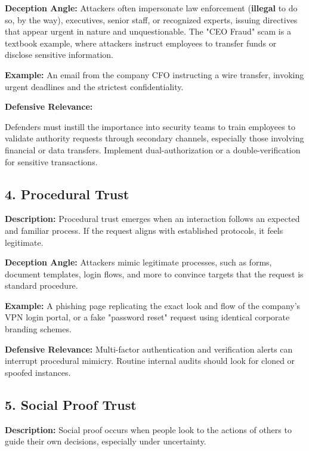 \textbf{Deception Angle:} Attackers often impersonate law enforcement (\textbf{illegal} to do so, by the way), executives, senior staff, or recognized experts, issuing directives that appear urgent in nature and unquestionable. The "CEO Fraud" scam is a textbook example, where attackers instruct employees to transfer funds or disclose sensitive information.

\textbf{Example:} An email from the company CFO instructing a wire transfer, invoking urgent deadlines and the strictest confidentiality.

\begin{svgraybox}
    \textbf{Defensive Relevance:}

    Defenders must instill the importance into security teams to train employees to validate authority requests through secondary channels, especially those involving financial or data transfers. Implement dual-authorization or a double-verification for sensitive transactions.
\end{svgraybox}

\subsection{4. Procedural Trust}
\textbf{Description:} Procedural trust emerges when an interaction follows an expected and familiar process. If the request aligns with established protocols, it feels legitimate.

\textbf{Deception Angle:} Attackers mimic legitimate processes, such as forms, document templates, login flows, and more to convince targets that the request is standard procedure.

\textbf{Example:} A phishing page replicating the exact look and flow of the company's VPN login portal, or a fake "password reset" request using identical corporate branding schemes.

\begin{svgraybox}
    \textbf{Defensive Relevance:}
    Multi-factor authentication and verification alerts can interrupt procedural mimicry. Routine internal audits should look for cloned or spoofed instances.
\end{svgraybox}

\subsection{5. Social Proof Trust}
\textbf{Description:} Social proof occurs when people look to the actions of others to guide their own decisions, especially under uncertainty.

